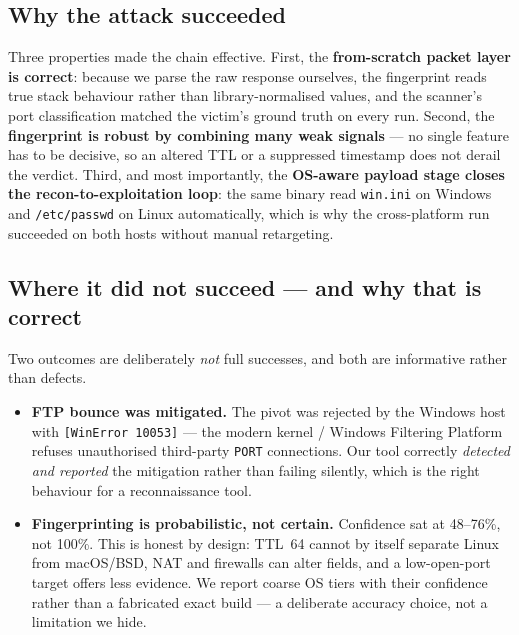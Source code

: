 \subsection{Why the attack succeeded}
Three properties made the chain effective. First, the \textbf{from-scratch packet layer is
correct}: because we parse the raw response ourselves, the fingerprint reads true stack
behaviour rather than library-normalised values, and the scanner's port classification
matched the victim's ground truth on every run. Second, the \textbf{fingerprint is robust
by combining many weak signals} — no single feature has to be decisive, so an altered TTL
or a suppressed timestamp does not derail the verdict. Third, and most importantly, the
\textbf{OS-aware payload stage closes the recon-to-exploitation loop}: the same binary read
\texttt{win.ini} on Windows and \texttt{/etc/passwd} on Linux automatically, which is why
the cross-platform run succeeded on both hosts without manual retargeting.

\subsection{Where it did not succeed — and why that is correct}
Two outcomes are deliberately \emph{not} full successes, and both are informative rather
than defects.

\begin{itemize}
\item \textbf{FTP bounce was mitigated.} The pivot was rejected by the Windows host with
\texttt{[WinError 10053]} — the modern kernel / Windows Filtering Platform refuses
unauthorised third-party \texttt{PORT} connections. Our tool correctly \emph{detected and
reported} the mitigation rather than failing silently, which is the right behaviour for a
reconnaissance tool.
\item \textbf{Fingerprinting is probabilistic, not certain.} Confidence sat at 48--76\%,
not 100\%. This is honest by design: TTL~64 cannot by itself separate Linux from macOS/BSD,
NAT and firewalls can alter fields, and a low-open-port target offers less evidence. We
report coarse OS tiers with their confidence rather than a fabricated exact build — a
deliberate accuracy choice, not a limitation we hide.
\end{itemize}

